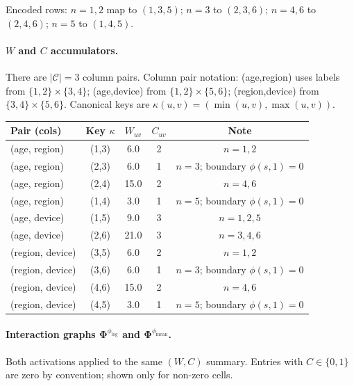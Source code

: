 \documentclass[11pt]{article}
\begin{document}
\noindent
Encoded rows: $n=1,2$ map to $(1,3,5)$; $n=3$ to $(2,3,6)$; $n=4,6$ to $(2,4,6)$; $n=5$ to $(1,4,5)$.

\paragraph{$W$ and $C$ accumulators.}
There are $|\mathcal{C}| = 3$ column pairs.
Column pair notation: (age,region) uses labels from $\{1,2\}\times\{3,4\}$; (age,device) from $\{1,2\}\times\{5,6\}$; (region,device) from $\{3,4\}\times\{5,6\}$.
Canonical keys are $\kappa(u,v) = (\min(u,v), \max(u,v))$.

\medskip
\begin{center}
\begin{tabular}{lcccc}
\hline
Pair (cols) & Key $\kappa$ & $W_{uv}$ & $C_{uv}$ & Note \\
\hline
(age, region)   & (1,3) & 6.0  & 2 & $n=1,2$ \\
(age, region)   & (2,3) & 6.0  & 1 & $n=3$; boundary $\phi(s,1)=0$ \\
(age, region)   & (2,4) & 15.0 & 2 & $n=4,6$ \\
(age, region)   & (1,4) & 3.0  & 1 & $n=5$; boundary $\phi(s,1)=0$ \\
(age, device)   & (1,5) & 9.0  & 3 & $n=1,2,5$ \\
(age, device)   & (2,6) & 21.0 & 3 & $n=3,4,6$ \\
(region, device) & (3,5) & 6.0  & 2 & $n=1,2$ \\
(region, device) & (3,6) & 6.0  & 1 & $n=3$; boundary $\phi(s,1)=0$ \\
(region, device) & (4,6) & 15.0 & 2 & $n=4,6$ \\
(region, device) & (4,5) & 3.0  & 1 & $n=5$; boundary $\phi(s,1)=0$ \\
\hline
\end{tabular}
\end{center}

\paragraph{Interaction graphs $\bm{\Phi}^{\phi_{\log}}$ and $\bm{\Phi}^{\phi_{\mathrm{mean}}}$.}
Both activations applied to the same $(W,C)$ summary.
Entries with $C \in \{0,1\}$ are zero by convention; shown only for non-zero cells.
\end{document}
